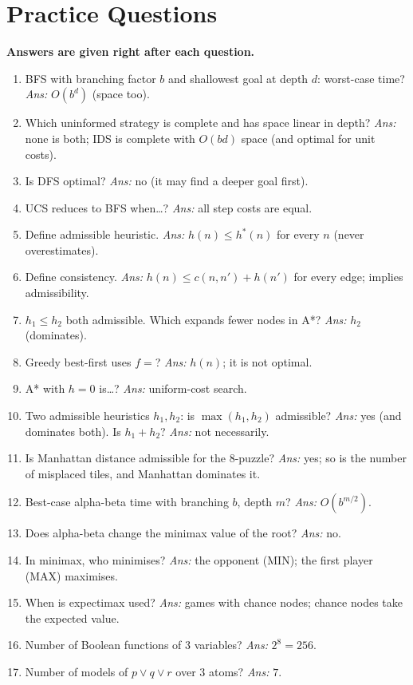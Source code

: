\documentclass[11pt,a4paper]{article}
\begin{document}
\section{Practice Questions}
\noindent\textbf{Answers are given right after each question.}
\begin{enumerate}[leftmargin=*,itemsep=4pt]
\item BFS with branching factor $b$ and shallowest goal at depth $d$: worst-case time? \emph{Ans:} $O(b^d)$ (space too).
\item Which uninformed strategy is complete and has space linear in depth? \emph{Ans:} none is both; IDS is complete with $O(bd)$ space (and optimal for unit costs).
\item Is DFS optimal? \emph{Ans:} no (it may find a deeper goal first).
\item UCS reduces to BFS when\dots? \emph{Ans:} all step costs are equal.
\item Define admissible heuristic. \emph{Ans:} $h(n)\le h^*(n)$ for every $n$ (never overestimates).
\item Define consistency. \emph{Ans:} $h(n)\le c(n,n')+h(n')$ for every edge; implies admissibility.
\item $h_1\le h_2$ both admissible. Which expands fewer nodes in A*? \emph{Ans:} $h_2$ (dominates).
\item Greedy best-first uses $f=$? \emph{Ans:} $h(n)$; it is not optimal.
\item A* with $h=0$ is\dots? \emph{Ans:} uniform-cost search.
\item Two admissible heuristics $h_1,h_2$: is $\max(h_1,h_2)$ admissible? \emph{Ans:} yes (and dominates both). Is $h_1+h_2$? \emph{Ans:} not necessarily.
\item Is Manhattan distance admissible for the 8-puzzle? \emph{Ans:} yes; so is the number of misplaced tiles, and Manhattan dominates it.
\item Best-case alpha-beta time with branching $b$, depth $m$? \emph{Ans:} $O(b^{m/2})$.
\item Does alpha-beta change the minimax value of the root? \emph{Ans:} no.
\item In minimax, who minimises? \emph{Ans:} the opponent (MIN); the first player (MAX) maximises.
\item When is expectimax used? \emph{Ans:} games with chance nodes; chance nodes take the expected value.
\item Number of Boolean functions of $3$ variables? \emph{Ans:} $2^{8}=256$.
\item Number of models of $p\vee q\vee r$ over $3$ atoms? \emph{Ans:} $7$.

\end{enumerate}
\end{document}
